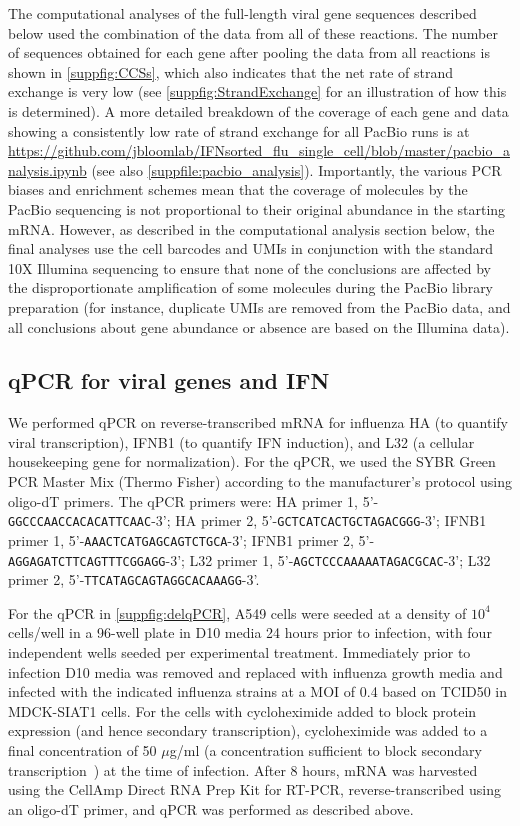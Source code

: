 \documentclass[10pt,letterpaper]{article}
\newcommand{\SUPPFILE}[1]{\autoref{suppfile:#1}}
\newcommand{\SUPPFIG}[1]{\autoref{suppfig:#1}}
\begin{document}
The computational analyses of the full-length viral gene sequences described below used the combination of the data from all of these reactions.
The number of sequences obtained for each gene after pooling the data from all reactions is shown in \SUPPFIG{CCSs}, which also indicates that the net rate of strand exchange is very low (see \SUPPFIG{StrandExchange} for an illustration of how this is determined).
A more detailed breakdown of the coverage of each gene and data showing a consistently low rate of strand exchange for all PacBio runs is at \url{https://github.com/jbloomlab/IFNsorted_flu_single_cell/blob/master/pacbio_analysis.ipynb} (see also \SUPPFILE{pacbio_analysis}).
Importantly, the various PCR biases and enrichment schemes mean that the coverage of molecules by the PacBio sequencing is not proportional to their original abundance in the starting mRNA.
However, as described in the computational analysis section below, the final analyses use the cell barcodes and UMIs in conjunction with the standard 10X Illumina sequencing to ensure that none of the conclusions are affected by the disproportionate amplification of some molecules during the PacBio library preparation (for instance, duplicate UMIs are removed from the PacBio data, and all conclusions about gene abundance or absence are based on the Illumina data).

\subsection*{qPCR for viral genes and IFN}
We performed qPCR on reverse-transcribed mRNA for influenza HA (to quantify viral transcription), IFNB1 (to quantify IFN induction), and L32 (a cellular housekeeping gene for normalization).
For the qPCR, we used the SYBR Green PCR Master Mix (Thermo Fisher) according to the manufacturer's protocol using oligo-dT primers.
The qPCR primers were: HA primer 1, 5'-\texttt{GGCCCAACCACACATTCAAC}-3'; HA primer 2, 5'-\texttt{GCTCATCACTGCTAGACGGG}-3'; IFNB1 primer 1, 5'-\texttt{AAACTCATGAGCAGTCTGCA}-3'; IFNB1 primer 2, 5'-\texttt{AGGAGATCTTCAGTTTCGGAGG}-3'; L32 primer 1, 5'-\texttt{AGCTCCCAAAAATAGACGCAC}-3'; L32 primer 2, 5'-\texttt{TTCATAGCAGTAGGCACAAAGG}-3'. 

For the qPCR in \SUPPFIG{delqPCR}, A549 cells were seeded at a density of $10^4$ cells/well in a 96-well plate in D10 media 24 hours prior to infection, with four independent wells seeded per experimental treatment. 
Immediately prior to infection D10 media was removed and replaced with influenza growth media and infected with the indicated influenza strains at a MOI of 0.4 based on TCID50 in MDCK-SIAT1 cells.
For the cells with cycloheximide added to block protein expression (and hence secondary transcription), cycloheximide was added to a final concentration of 50 $\mu$g/ml (a concentration sufficient to block secondary transcription~\cite{killip2014activation}) at the time of infection.
After 8 hours, mRNA was harvested using the CellAmp Direct RNA Prep Kit for RT-PCR, reverse-transcribed using an oligo-dT primer, and qPCR was performed as described above.
\end{document}
